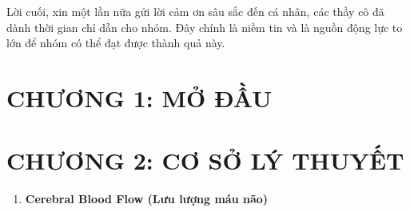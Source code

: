 \documentclass[12pt,a4paper]{article}
\begin{document}
 
 Lời cuối, xin một lần nữa gửi lời cảm ơn sâu sắc đến cá nhân, các thầy cô đã dành thời gian chỉ dẫn cho nhóm. Đây chính là niềm tin và là nguồn động lực to lớn để nhóm có thể đạt được thành quả này.
 \newpage
 
 \chapter{CHƯƠNG 1: MỞ ĐẦU}

 \newpage

 \chapter{CHƯƠNG 2: CƠ SỞ LÝ THUYẾT}
    \begin{enumerate} [2.1/]
        \item \textbf{Cerebral Blood Flow (Lưu lượng máu não)}
     \end{enumerate}
\end{document}
